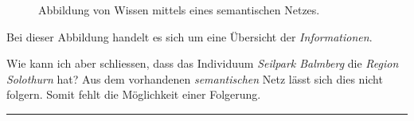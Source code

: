 \begin{figure}[H]
\centering {}
\caption{Abbildung von Wissen mittels eines semantischen Netzes.\label{fig:semantischesNetz}\protect\footnotemark}
\end{figure}

Bei dieser Abbildung handelt es sich um eine Übersicht der \textit{Informationen}.

Wie kann ich aber schliessen, dass das Individuum \textit{Seilpark Balmberg} die \textit{Region} \textit{Solothurn} hat? Aus dem vorhandenen \textit{semantischen} Netz lässt sich dies nicht folgern. Somit fehlt die Möglichkeit einer Folgerung.

\vspace{0.1pt}
\noindent\rule[1ex]{\textwidth}{1pt}
